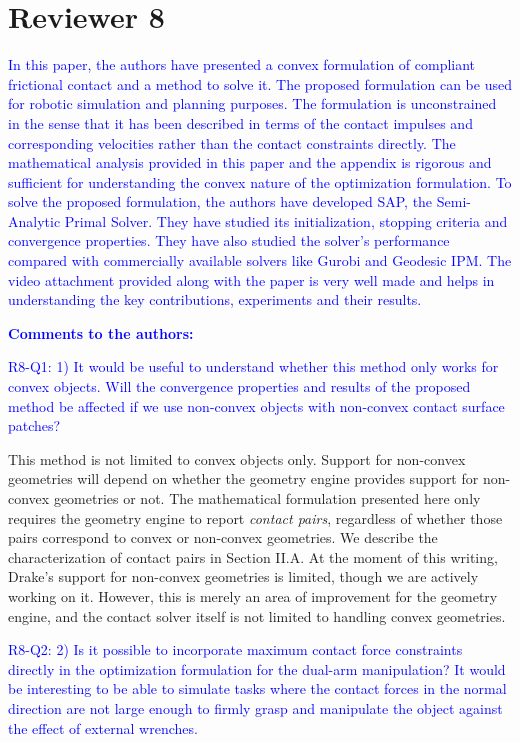 \section{Reviewer 8}
\label{sec:reviewer_8}

\textcolor{blue}{In this paper, the authors have presented a convex formulation
of compliant frictional contact and a method to solve it. The proposed
formulation can be used for robotic simulation and planning purposes. The
formulation is unconstrained in the sense that it has been described in terms of
the contact impulses and corresponding velocities rather than the contact
constraints directly. The mathematical analysis provided in this paper and the
appendix is rigorous and sufficient for understanding the convex nature of the
optimization formulation. To solve the proposed formulation, the authors have
developed SAP, the Semi-Analytic Primal Solver. They have studied its
initialization, stopping criteria and convergence properties. They have also
studied the solver's performance compared with commercially available solvers
like Gurobi and Geodesic IPM. The video attachment provided along with the paper
is very well made and helps in understanding the key contributions, experiments
and their results.}

\textcolor{blue}{\textbf{Comments to the authors:}}

\textcolor{blue}{R8-Q1: 1) It would be useful to understand whether this method
only works for convex objects. Will the convergence properties and results of
the proposed method be affected if we use non-convex objects with non-convex
contact surface patches?}

This method is not limited to convex objects only. Support for non-convex
geometries will depend on whether the geometry engine provides support for
non-convex geometries or not. The mathematical formulation presented here only
requires the geometry engine to report \emph{contact pairs}, regardless of
whether those pairs correspond to convex or non-convex geometries. We describe
the characterization of contact pairs in Section II.A. At the moment of this
writing, Drake's support for non-convex geometries is limited, though we are
actively working on it. However, this is merely an area of improvement for the
geometry engine, and the contact solver itself is not limited to handling convex
geometries.

\vspace{5mm}
\textcolor{blue}{R8-Q2: 2) Is it possible to incorporate maximum contact force
constraints directly in the optimization formulation for the dual-arm
manipulation? It would be interesting to be able to simulate tasks where the
contact forces in the normal direction are not large enough to firmly grasp and
manipulate the object against the effect of external wrenches.}

